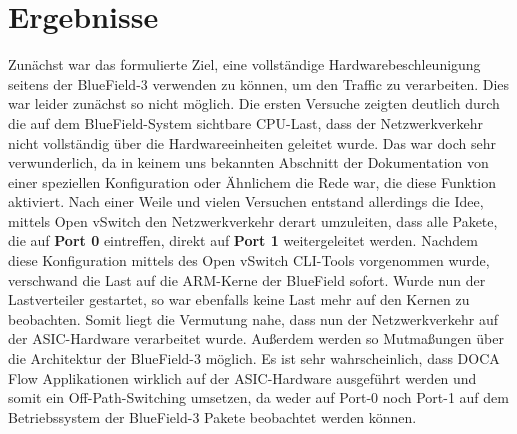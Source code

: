 \section{Ergebnisse}
Zunächst war das formulierte Ziel, eine vollständige Hardwarebeschleunigung seitens der BlueField-3 verwenden zu können, um den Traffic zu verarbeiten. Dies war leider zunächst so nicht möglich. Die ersten Versuche zeigten deutlich durch die auf dem BlueField-System sichtbare CPU-Last, dass der Netzwerkverkehr nicht vollständig über die Hardwareeinheiten geleitet wurde. Das war doch sehr verwunderlich, da in keinem uns bekannten Abschnitt der Dokumentation von einer speziellen Konfiguration oder Ähnlichem die Rede war, die diese Funktion aktiviert. Nach einer Weile und vielen Versuchen entstand allerdings die Idee, mittels Open vSwitch den Netzwerkverkehr derart umzuleiten, dass alle Pakete, die auf \textbf{Port 0} eintreffen, direkt auf \textbf{Port 1} weitergeleitet werden. Nachdem diese Konfiguration mittels des Open vSwitch CLI-Tools vorgenommen wurde, verschwand die Last auf die ARM-Kerne der BlueField sofort. Wurde nun der Lastverteiler gestartet, so war ebenfalls keine Last mehr auf den Kernen zu beobachten. Somit liegt die Vermutung nahe, dass nun der Netzwerkverkehr auf der ASIC-Hardware verarbeitet wurde. Außerdem werden so Mutmaßungen über die Architektur der BlueField-3 möglich. Es ist sehr wahrscheinlich, dass DOCA Flow Applikationen wirklich auf der ASIC-Hardware ausgeführt werden und somit ein Off-Path-Switching umsetzen, da weder auf Port-0 noch Port-1 auf dem Betriebssystem der BlueField-3 Pakete beobachtet werden können. 

